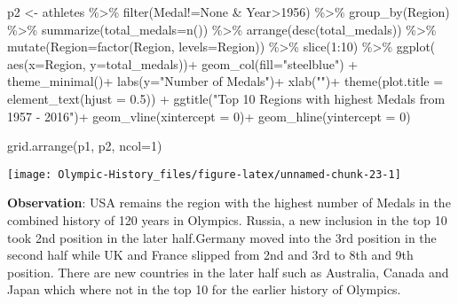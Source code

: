 \documentclass[
]{article}
\newenvironment{Shaded}{\begin{snugshade}}{\end{snugshade}}
\newcommand{\AttributeTok}[1]{\textcolor[rgb]{0.77,0.63,0.00}{#1}}
\newcommand{\DecValTok}[1]{\textcolor[rgb]{0.00,0.00,0.81}{#1}}
\newcommand{\FloatTok}[1]{\textcolor[rgb]{0.00,0.00,0.81}{#1}}
\newcommand{\FunctionTok}[1]{\textcolor[rgb]{0.00,0.00,0.00}{#1}}
\newcommand{\NormalTok}[1]{#1}
\newcommand{\OtherTok}[1]{\textcolor[rgb]{0.56,0.35,0.01}{#1}}
\newcommand{\SpecialCharTok}[1]{\textcolor[rgb]{0.00,0.00,0.00}{#1}}
\newcommand{\StringTok}[1]{\textcolor[rgb]{0.31,0.60,0.02}{#1}}
\begin{document}
\begin{Shaded}
\begin{Highlighting}[]
\NormalTok{p2 }\OtherTok{\textless{}{-}}
\NormalTok{athletes }\SpecialCharTok{\%\textgreater{}\%}
    \FunctionTok{filter}\NormalTok{(Medal}\SpecialCharTok{!=}\StringTok{\textquotesingle{}None\textquotesingle{}} \SpecialCharTok{\&}\NormalTok{ Year}\SpecialCharTok{\textgreater{}}\DecValTok{1956}\NormalTok{) }\SpecialCharTok{\%\textgreater{}\%}
    \FunctionTok{group\_by}\NormalTok{(Region) }\SpecialCharTok{\%\textgreater{}\%}
    \FunctionTok{summarize}\NormalTok{(}\AttributeTok{total\_medals=}\FunctionTok{n}\NormalTok{()) }\SpecialCharTok{\%\textgreater{}\%}
    \FunctionTok{arrange}\NormalTok{(}\FunctionTok{desc}\NormalTok{(total\_medals))  }\SpecialCharTok{\%\textgreater{}\%}
    \FunctionTok{mutate}\NormalTok{(}\AttributeTok{Region=}\FunctionTok{factor}\NormalTok{(Region, }\AttributeTok{levels=}\NormalTok{Region)) }\SpecialCharTok{\%\textgreater{}\%}
    \FunctionTok{slice}\NormalTok{(}\DecValTok{1}\SpecialCharTok{:}\DecValTok{10}\NormalTok{) }\SpecialCharTok{\%\textgreater{}\%}
    \FunctionTok{ggplot}\NormalTok{( }\FunctionTok{aes}\NormalTok{(}\AttributeTok{x=}\NormalTok{Region, }\AttributeTok{y=}\NormalTok{total\_medals))}\SpecialCharTok{+}
    \FunctionTok{geom\_col}\NormalTok{(}\AttributeTok{fill=}\StringTok{"steelblue"}\NormalTok{) }\SpecialCharTok{+}  
    \FunctionTok{theme\_minimal}\NormalTok{()}\SpecialCharTok{+}
    \FunctionTok{labs}\NormalTok{(}\AttributeTok{y=}\StringTok{"Number of Medals"}\NormalTok{)}\SpecialCharTok{+}
    \FunctionTok{xlab}\NormalTok{(}\StringTok{""}\NormalTok{)}\SpecialCharTok{+}
    \FunctionTok{theme}\NormalTok{(}\AttributeTok{plot.title =} \FunctionTok{element\_text}\NormalTok{(}\AttributeTok{hjust =} \FloatTok{0.5}\NormalTok{)) }\SpecialCharTok{+}
    \FunctionTok{ggtitle}\NormalTok{(}\StringTok{"Top 10 Regions with highest Medals from 1957 {-} 2016"}\NormalTok{)}\SpecialCharTok{+}
    \FunctionTok{geom\_vline}\NormalTok{(}\AttributeTok{xintercept =} \DecValTok{0}\NormalTok{)}\SpecialCharTok{+}
    \FunctionTok{geom\_hline}\NormalTok{(}\AttributeTok{yintercept =} \DecValTok{0}\NormalTok{)}

\FunctionTok{grid.arrange}\NormalTok{(p1, p2, }\AttributeTok{ncol=}\DecValTok{1}\NormalTok{)}
\end{Highlighting}
\end{Shaded}

\begin{center}\texttt{[image: Olympic-History\_files/figure-latex/unnamed-chunk-23-1]} \end{center}

\textbf{Observation}: USA remains the region with the highest number of
Medals in the combined history of 120 years in Olympics. Russia, a new
inclusion in the top 10 took 2nd position in the later half.Germany
moved into the 3rd position in the second half while UK and France
slipped from 2nd and 3rd to 8th and 9th position. There are new
countries in the later half such as Australia, Canada and Japan which
where not in the top 10 for the earlier history of Olympics.
\end{document}
